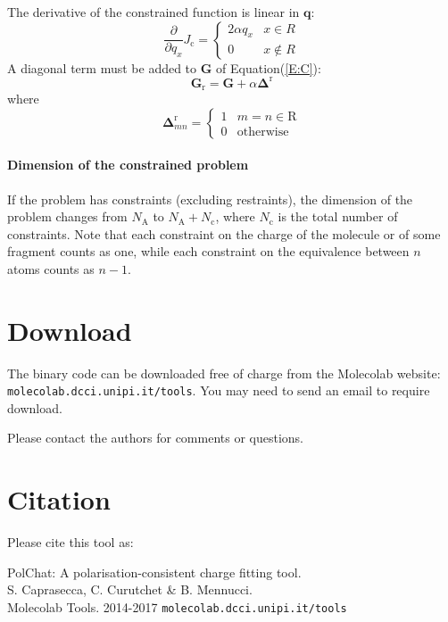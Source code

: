 \documentclass[a4paper]{report}
\newcommand{\bs}{\boldsymbol}
\newcommand{\mr}{\mathrm}
\newcommand{\NAA}[0]{{N_\mathrm{A}}}
\newcommand{\NCC}[0]{{N_\mathrm{c}}}
\begin{document}
The derivative of the constrained function is linear in $\bs{q}$:
\begin{equation}
\frac{\partial}{\partial q_x} J_\mr{c} = \left\{ \begin{array}{ll}
2 \alpha q_x & x \in R \\
0       & x \notin R \end{array} \right.
\end{equation}
A diagonal term must be added to $\bs{G}$ of Equation(\ref{E:C}):
\begin{equation}
\bs{G}_\mr{r} = \bs{G} + \alpha \bs{\Delta}^\mr{r}
\end{equation}
where
\begin{equation}
\bs{\Delta}^\mr{r}_{mn} = \left\{\begin{array}{ll} 1 & m=n\in\mr{R} \\ 0 & \mr{otherwise} \end{array}\right.
\end{equation}

\paragraph{Dimension of the constrained problem}

If the problem has constraints (excluding restraints), the dimension of the problem changes from $\NAA$ to $\NAA+\NCC$, where $\NCC$ is the total number of constraints. Note that each constraint on the charge of the molecule or of some fragment counts as one, while each constraint on the equivalence between $n$ atoms counts as $n-1$.

\section*{Download}

The binary code can be downloaded free of charge from the Molecolab website:
\texttt{molecolab.dcci.unipi.it/tools}. You may need to send an email to require download.

Please contact the authors for comments or questions.

\section*{Citation}

Please cite this tool as:

\indent PolChat: A polarisation-consistent charge fitting tool. \\
\indent S. Caprasecca, C. Curutchet \& B. Mennucci. \\
\indent Molecolab Tools. 2014-2017 \texttt{molecolab.dcci.unipi.it/tools}
\end{document}
